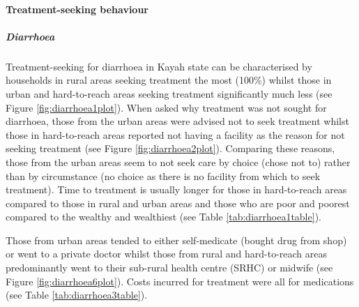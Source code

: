 \documentclass[12pt,a4paper]{article}
\let\oldparagraph\paragraph
\renewcommand{\paragraph}[1]{\oldparagraph{#1}\mbox{}}
\let\oldsubparagraph\subparagraph
\renewcommand{\subparagraph}[1]{\oldsubparagraph{#1}\mbox{}}
\begin{document}
\hypertarget{ctreatment}{%
\paragraph{Treatment-seeking behaviour}\label{ctreatment}}

\hypertarget{diarrhoea}{%
\subparagraph{Diarrhoea}\label{diarrhoea}}

Treatment-seeking for diarrhoea in Kayah state can be characterised by households in rural areas seeking treatment the most (100\%) whilst those in urban and hard-to-reach areas seeking treatment significantly much less (see Figure \ref{fig:diarrhoea1plot}). When asked why treatment was not sought for diarrhoea, those from the urban areas were advised not to seek treatment whilst those in hard-to-reach areas reported not having a facility as the reason for not seeking treatment (see Figure \ref{fig:diarrhoea2plot}). Comparing these reasons, those from the urban areas seem to not seek care by choice (chose not to) rather than by circumstance (no choice as there is no facility from which to seek treatment). Time to treatment is usually longer for those in hard-to-reach areas compared to those in rural and urban areas and those who are poor and poorest compared to the wealthy and wealthiest (see Table \ref{tab:diarrhoea1table}).

Those from urban areas tended to either self-medicate (bought drug from shop) or went to a private doctor whilst those from rural and hard-to-reach areas predominantly went to their sub-rural health centre (SRHC) or midwife (see Figure \ref{fig:diarrhoea6plot}). Costs incurred for treatment were all for medications (see Table \ref{tab:diarrhoea3table}).
\end{document}
